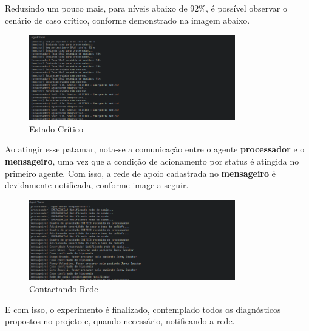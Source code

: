Reduzindo um pouco mais, para níveis abaixo de 92\%, é possível observar o cenário de caso crítico, conforme demonstrado na imagem abaixo. 

\begin{figure}[H]
  \centering
  \includegraphics[width=0.8\textwidth]{assets/img/perception.emergency.png}
  \caption{Estado Crítico}
  \label{fig:circuit}
\end{figure}

Ao atingir esse patamar, nota-se a comunicação entre o agente \textbf{processador} e o \textbf{mensageiro}, uma vez que a condição de acionamento por status é atingida no primeiro agente. Com isso, a rede de apoio cadastrada no \textbf{mensageiro} é devidamente notificada, conforme image a seguir.

\begin{figure}[H]
  \centering
  \includegraphics[width=0.8\textwidth]{assets/img/netwokcall.png}
  \caption{Contactando Rede}
  \label{fig:circuit}
\end{figure}

E com isso, o experimento é finalizado, contemplado todos os diagnósticos propostos no projeto e, quando necessário, notificando a rede.


% 

